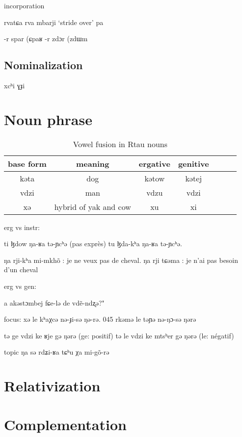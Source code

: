 \documentclass[oneside,a4paper,11pt]{article}
\newcommand{\ipa}[1]{{\phon #1}} %
\begin{document}
 
incorporation

\ipa{rvatɕa} \ipa{rva}
\ipa{mbarji} `stride over' \ipa{pa}

\ipa{-r} \ipa{spar} (\ipa{ɕpaʁ}
\ipa{-r} \ipa{zdɔr} (\ipa{zdɯm}

\subsection{Nominalization}

\ipa{xcʰi} \ipa{ɣɟi}

 \section{Noun phrase}
\begin{table}[H]
\caption{Vowel fusion in Rtau nouns} \label{tab:alternation.noun} \centering
\begin{tabular}{c|cccccc}
\toprule
base form & meaning & ergative & genitive \\
\midrule
\ipa{kəta} & dog & \ipa{kətow} & \ipa{kətej} & \\
\ipa{vdzi} & man & \ipa{vdzu} & \ipa{vdzi} & \\
\ipa{xə} & hybrid of yak and cow & \ipa{xu} & \ipa{xi} & \\
\bottomrule
\end{tabular}
\end{table}

erg vs instr:


	ti ɮdow ŋa-ʁa tə-ɲcʰə (pas exprès)
	tu ɮda-kʰa ŋa-ʁa tə-ɲcʰə.
	
	
		ŋa rji-kʰa mi-mkhõ : je ne veux pas de cheval.
	ŋa rji tɕəma : je n'ai pas besoin d'un cheval

erg vs gen:

a akəstɔmbej fɕe-lə de vdẽ-ndʐə?"

focus:
xə le kʰaχcə nə-ɟi-sə ŋə-rə.
045	rkəmə le təɲə nə-ŋɔ-sə ŋərə

		tə ge vdzi ke ʁje gə ŋərə (ge: positif)
		tə le vdzi ke mtsʰer gə ŋərə (le: négatif)


topic
ŋa sə rdʑi-ʁa tɕʰu χa mi-gõ-rə 

\section{Relativization}

\section{Complementation}  
\end{document}
